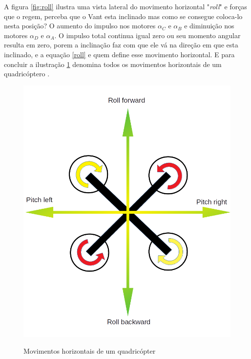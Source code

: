 A figura \ref{fig:roll} ilustra uma vista lateral do movimento horizontal "\textit{roll}" e forças que o regem, perceba que o Vant esta inclinado mas como se consegue coloca-lo nesta posição? O aumento do impulso nos motores $\alpha_{C}$ e $\alpha_{B}$ e diminuição nos motores $\alpha_{D}$ e $\alpha_{A}$. O impulso total continua igual zero ou seu momento angular resulta em zero, porem a inclinação faz com que ele vá na direção em que esta inclinado, e a equação \ref{roll} e quem define esse movimento horizontal.
E para concluir a ilustração \ref{fig:dirdrone} denomina todos os movimentos horizontais de um quadricóptero \cite{calcmov}.  

\begin{figure}[htb]
  \centering
  \caption{Movimentos horizontais de um quadricópter }
  \includegraphics[scale=.3]{figs/sentido.png}
  \label{fig:dirdrone}
\end{figure}

